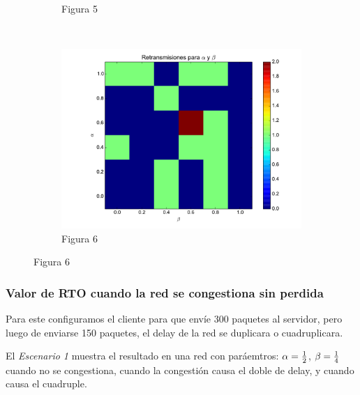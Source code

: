 \begin{figure}[H]
\begin{subfigure}{0.32\textwidth}
		    \caption{Figura 5}
	    \end{subfigure}
	    ~
	    \begin{subfigure}{0.32\textwidth}
		    \includegraphics[width=1.0\textwidth]{imagenes/retransmisiones_300.pdf}
		    \caption{Figura 6}
	    \end{subfigure}
	
    \end{figure}    


    \subsubsection{Valor de RTO cuando la red se congestiona sin perdida}
        Para este configuramos el cliente para que env\'ie 300 paquetes al
        servidor, pero luego de enviarse 150 paquetes, el delay de la red
        se duplicara o cuadruplicara. 
        
        El \emph{Escenario 1} muestra el resultado en una red con
        par\'aemtros: $\alpha={{1}\over{2}}$, $\beta={{1}\over{4}}$
        cuando no se congestiona, cuando la congesti\'on causa el doble de
        delay, y cuando causa el cuadruple.
  
